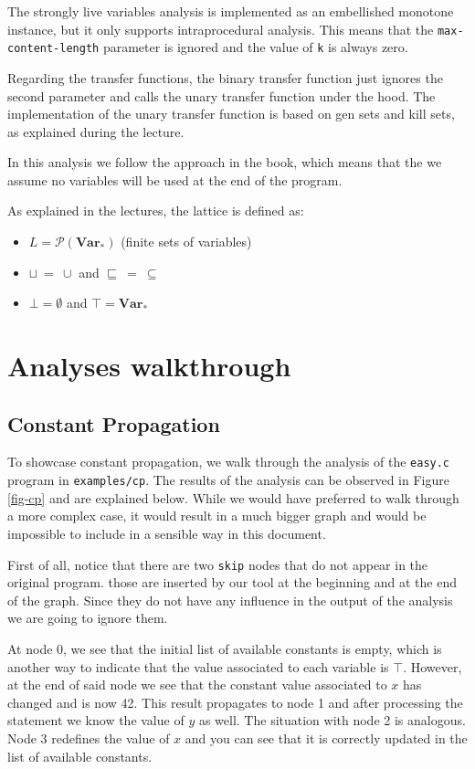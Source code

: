\documentclass{article}
\begin{document}
The strongly live variables analysis is implemented as an embellished monotone instance, but it only supports intraprocedural analysis. This means that the \texttt{max-content-length} parameter is ignored and the value of \texttt{k} is always zero.

Regarding the transfer functions, the binary transfer function just ignores the second parameter and calls the unary transfer function under the hood. The implementation of the unary transfer function is based on gen sets and kill sets, as explained during the lecture.

In this analysis we follow the approach in the book, which means that the we assume no variables will be used at the end of the program.

As explained in the lectures, the lattice is defined as:

\begin{itemize}
	\item $L = \mathcal{P}(\mathbf{Var_*})$ (finite sets of variables)
	\item $\sqcup\ =\ \cup$ and $\sqsubseteq\ =\ \subseteq$
	\item $\bot = \emptyset$ and $\top = \mathbf{Var_*}$
\end{itemize}

\section{Analyses walkthrough}

\subsection*{Constant Propagation}

To showcase constant propagation, we walk through the analysis of the \texttt{easy.c} program in \texttt{examples/cp}. The results of the analysis can be observed in Figure \ref{fig-cp} and are explained below. While we would have preferred to walk through a more complex case, it would result in a much bigger graph and would be impossible to include in a sensible way in this document.

First of all, notice that there are two \texttt{skip} nodes that do not appear in the original program. those are inserted by our tool at the beginning and at the end of the graph. Since they do not have any influence in the output of the analysis we are going to ignore them.

At node 0, we see that the initial list of available constants is empty, which is another way to indicate that the value associated to each variable is $\top$. However, at the end of said node we see that the constant value associated to $x$ has changed and is now 42. This result propagates to node 1 and after processing the statement we know the value of $y$ as well. The situation with node 2 is analogous. Node 3 redefines the value of $x$ and you can see that it is correctly updated in the list of available constants.
\end{document}
